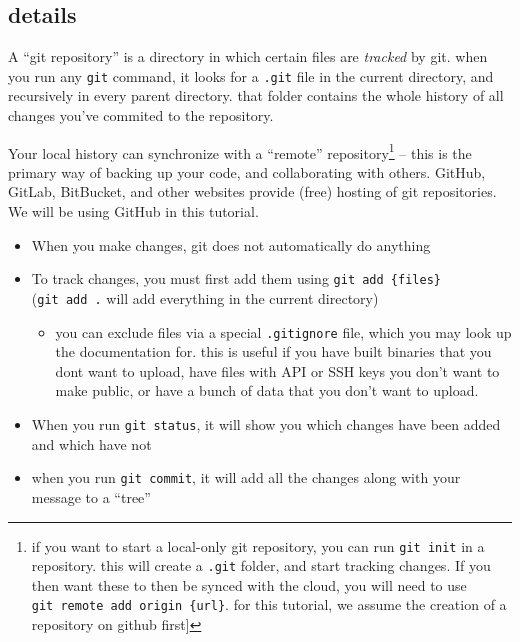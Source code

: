 \documentclass[
]{article}
\providecommand{\tightlist}{%
  \setlength{\itemsep}{0pt}\setlength{\parskip}{0pt}}
\begin{document}
\hypertarget{details}{%
\subsection{details}\label{details}}

A ``git repository'' is a directory in which certain files are
\emph{tracked} by git. when you run any \texttt{git} command, it looks
for a \texttt{.git} file in the current directory, and recursively in
every parent directory. that folder contains the whole history of all
changes you've commited to the repository.

Your local history can synchronize with a ``remote''
repository\footnote{if you want to start a local-only git repository,
  you can run \texttt{git\ init} in a repository. this will create a
  \texttt{.git} folder, and start tracking changes. If you then want
  these to then be synced with the cloud, you will need to use
  \texttt{git\ remote\ add\ origin\ \{url\}}. for this tutorial, we
  assume the creation of a repository on github first{]}} -- this is the
primary way of backing up your code, and collaborating with others.
GitHub, GitLab, BitBucket, and other websites provide (free) hosting of
git repositories. We will be using GitHub in this tutorial.

\begin{itemize}
\tightlist
\item
  When you make changes, git does not automatically do anything
\item
  To track changes, you must first add them using
  \texttt{git\ add\ \{files\}} (\texttt{git\ add\ .} will add everything
  in the current directory)

  \begin{itemize}
  \tightlist
  \item
    you can exclude files via a special \texttt{.gitignore} file, which
    you may look up the documentation for. this is useful if you have
    built binaries that you dont want to upload, have files with API or
    SSH keys you don't want to make public, or have a bunch of data that
    you don't want to upload.
  \end{itemize}
\item
  When you run \texttt{git\ status}, it will show you which changes have
  been added and which have not
\item
  when you run \texttt{git\ commit}, it will add all the changes along
  with your message to a ``tree''
\end{itemize}
\end{document}

